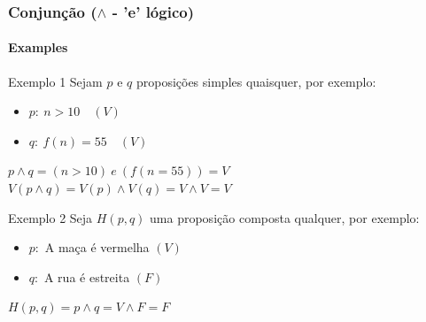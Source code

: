 \documentclass[10pt, headsepline, captions=tableabove, xcolor=table]{beamer}
\begin{document}
%
\begin{frame}[t]
    \frametitle{Conjunção ($\land$ - 'e' lógico)}
    \framesubtitle{Examples}
    \begin{exampleblock}{Exemplo 1}
        Sejam $p$ e $q$ proposições simples quaisquer, por exemplo:
        \begin{itemize}
            \item $p:~n > 10 \quad (V)$
            \item $q:~f(n) = 55 \quad (V)$
        \end{itemize}
        $p \land q = (n >10)~e~(f(n = 55)) = V$ \\[2pt]
        $V(p \land q) = V(p) \land V(q) = V \land V = V$
    \end{exampleblock}
    \begin{exampleblock}{Exemplo 2}
        Seja $H(p,q)$ uma proposição composta qualquer, por exemplo:
        \begin{itemize}
            \item $p:$ A maça é vermelha $(V)$
            \item $q:$ A rua é estreita  $(F)$
        \end{itemize}
        $H(p,q) = p \land q = V \land F = F$
    \end{exampleblock}
\end{frame}
%
\end{document}

